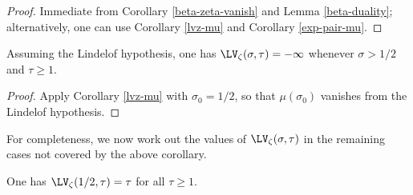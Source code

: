 \begin{proof} Immediate from Corollary \ref{beta-zeta-vanish} and Lemma \ref{beta-duality}; alternatively, one can use Corollary \ref{lvz-mu} and Corollary \ref{exp-pair-mu}.
\end{proof}


\begin{corollary}\label{lh-vanish} Assuming the Lindelof hypothesis, one has $\LV_\zeta(\sigma,\tau) = -\infty$ whenever $\sigma > 1/2$ and $\tau \geq 1$.
\end{corollary}

\begin{proof} Apply Corollary \ref{lvz-mu} with $\sigma_0=1/2$, so that $\mu(\sigma_0)$ vanishes from the Lindelof hypothesis.
\end{proof}

For completeness, we now work out the values of $\LV_\zeta(\sigma,\tau)$ in the remaining cases not covered by the above corollary.

\begin{lemma}[Value at $\sigma=1/2$]\label{lvz-2} One has $\LV_\zeta(1/2,\tau) = \tau$ for all $\tau \geq 1$.
\end{lemma}

